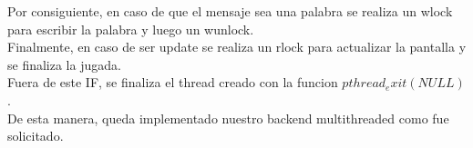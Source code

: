 Por consiguiente, en caso de que el mensaje sea una palabra se realiza un wlock para escribir la palabra y luego un wunlock.\\
Finalmente, en caso de ser update se realiza un rlock para actualizar la pantalla y se finaliza la jugada.\\

Fuera de este IF, se finaliza el thread creado con la funcion $pthread_exit(NULL)$.\\

De esta manera, queda implementado nuestro backend multithreaded como fue solicitado.






